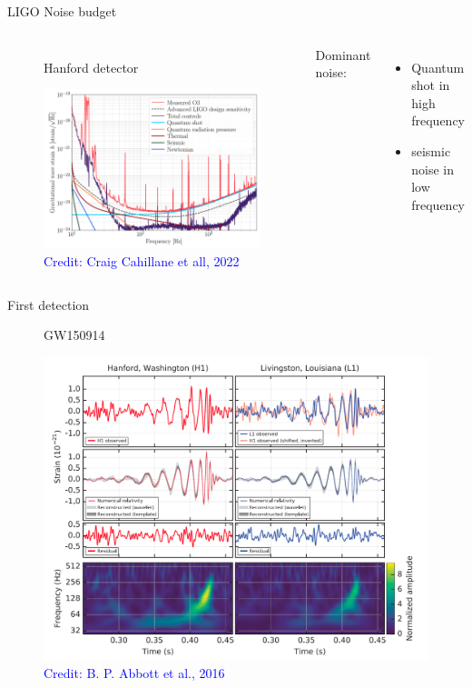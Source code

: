 \documentclass[pdf]{beamer}
\newcommand{\credit}[1]{\tiny{\textcolor{blue}{Credit: #1}}}
\begin{document}
\begin{frame}{LIGO Noise budget}
\begin{columns}
\begin{figure}
\caption*{Hanford detector}
\includegraphics[scale=.17]{fig/noise-budget-ligo.png}
\caption*{\credit{Craig Cahillane et all, 2022}}
\end{figure}

Dominant noise:

\begin{itemize}
\item  
Quantum shot in high frequency

\item  
seismic noise in low frequency
\end{itemize}

\end{columns}
\end{frame}

\begin{frame}{First detection}
\begin{figure}
\caption*{GW150914}
\includegraphics[scale=.17]{fig/GW150914.png}
\caption*{\credit{B. P. Abbott et al., 2016}}
\end{figure}
\end{frame}
\end{document}

